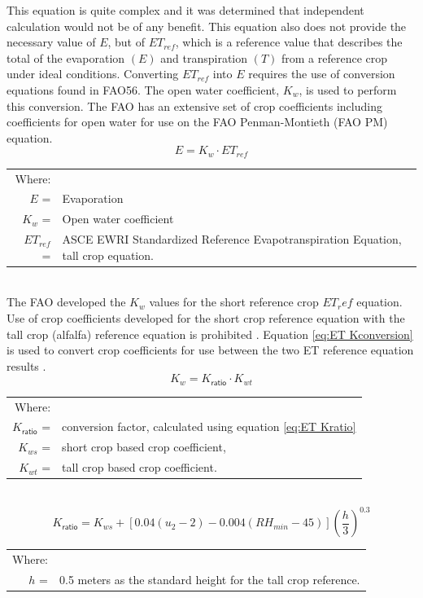 \begin{linenumbers}
This equation is quite complex and it was determined that independent calculation would not be of any benefit.  This equation also does not provide the necessary value of $ E $, but of  $ ET_{ref} $, which is a reference value that describes the total of the evaporation $ (E) $ and transpiration $ (T) $ from a reference crop under ideal conditions.  Converting $ ET_{ref} $ into $ E $ requires the use of conversion equations found in FAO56.  The open water coefficient, $K_w$, is used to perform this conversion.  The FAO has an extensive set of crop coefficients including coefficients for open water for use on the FAO Penman-Montieth (FAO PM) equation.  
\begin{equation}
\label{eq:ETcoef}
E=K_w \cdot ET_{ref}
\end{equation}
\begin{tabular}{r p{5.5in}}
Where:&\\
$E$ = & Evaporation\\
$K_w$ = & Open water coefficient\\
$ET_{ref}$ = & ASCE EWRI Standardized Reference Evapotranspiration Equation, tall crop equation.\\
\end{tabular}\\

The FAO developed the $K_w$ values for the short reference crop $ET_ref$ equation.  Use of crop coefficients developed for the short crop reference equation with the tall crop (alfalfa) reference equation is prohibited  \parencite{FAO56, Allen2011}.  Equation \ref{eq:ET Kconversion} is used to convert crop coefficients for use between the two ET reference equation results \parencite{FAO56}.
\begin{equation}
\label{eq:ET Kconversion}
	K_{w}=K_\mathsf{ratio} \cdot K_{wt}
\end{equation}
\begin{tabular}{r p{5.5in}}
Where:&\\
$K_\mathsf{ratio}$ =& conversion factor, calculated using equation \ref{eq:ET Kratio}\\
$K_{ws}$ =& short crop based crop coefficient, \\
$K_{wt}$ =& tall crop based crop coefficient.\\
\end{tabular}\\

\begin{equation}
\label{eq:ET Kratio}
	K_\mathsf{ratio}=K_{ws}+[0.04(u_2-2)-0.004(RH_{min}-45)] \left(\frac{h}{3} \right)^{0.3}
\end{equation}
\begin{tabular}{r l}
Where:&\\
$h$ =& 0.5 meters as the standard height for the tall crop reference.
\end{tabular}\\


\end{linenumbers}
